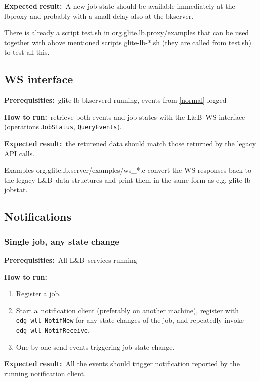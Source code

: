 \documentclass{egee}
\def\LB{L\&B}
\def\req{\noindent\textbf{Prerequisities:}}
\def\how{\noindent\textbf{How to run:}}
\def\result{\noindent\textbf{Expected result:}}
\def\path#1{{\normalfont\textsf{#1}}}
\def\code#1{\texttt{#1}}
\begin{document}
\result\ A new job state should be available immediately at the
lbproxy and probably with a small delay also at the bkserver.

\begin{hints}
There is already a script \path{test.sh} in
\path{org.glite.lb.proxy/examples} that can be used together with
above mentioned scripts \path{glite-lb-*.sh} (they are called from
\path{test.sh}) to test all this.
\end{hints}

\subsection{WS interface}
\req\ \path{glite-lb-bkserverd} running, events from \ref{normal} logged

\how\ retrieve both events and job states with the \LB\ WS interface
(operations \code{JobStatus}, \code{QueryEvents}).

\result\ the returened data should match those returned by the legacy
API calls.

\begin{hints}
Examples \path{org.glite.lb.server/examples/ws\_*.c} convert the WS
responses back to the legacy \LB\ data structures and print them in
the same form as e.g. \path{glite-lb-jobstat}.
\end{hints}

\subsection{Notifications}

\subsubsection{Single job, any state change}
\label{notif1}
\req\ All \LB\ services running

\how
\begin{enumerate}
\item Register a job. 
\item Start a~notification client (preferably on another machine),
register with \code{edg\_wll\_NotifNew} for any state changes of the job, 
and repeatedly invoke \code{edg\_wll\_NotifReceive}.
\item One by one send events triggering job state change. 
\end{enumerate}

\result\ All the events should trigger notification reported by the running
notification client.
\end{document}
